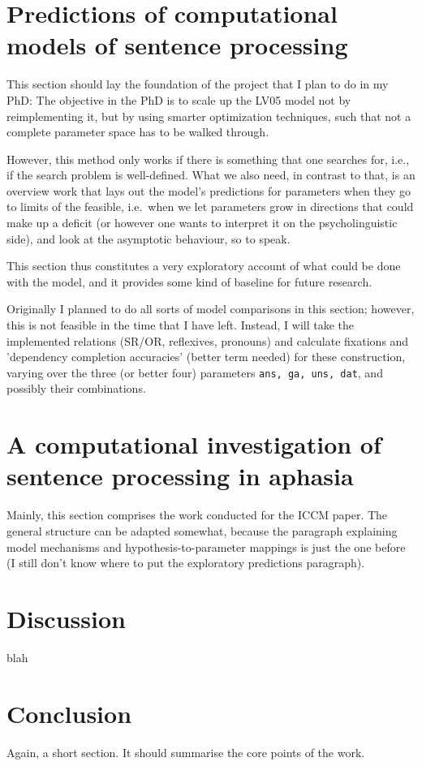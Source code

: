 \documentclass{scrartcl}
\begin{document}
\section{Predictions of computational models of sentence processing}

This section should lay the foundation of the project that I plan to do in my PhD:
The objective in the PhD is to scale up the LV05 model not by reimplementing it, but by
using smarter optimization techniques, such that not a complete parameter space has to 
be walked through.

However, this method only works if there is something that one searches for, i.e., if the
search problem is well-defined. What we also need, in contrast to that, is an overview work
that lays out the model's predictions for parameters when they go to limits of the feasible,
i.e.\ when we let parameters grow in directions that could make up a deficit (or however one
wants to interpret it on the psycholinguistic side), and look at the asymptotic behaviour,
so to speak.

This section thus constitutes a very exploratory account of what could be done with the model,
and it provides some kind of baseline for future research.

Originally I planned to do all sorts of model comparisons in this section; however, this is not feasible
in the time that I have left. Instead, I will take the implemented relations (SR/OR, reflexives, pronouns)
and calculate fixations and 'dependency completion accuracies' (better term needed) for these construction,
varying over the three (or better four) parameters \texttt{ans, ga, uns, dat}, and possibly their combinations.


\section{A computational investigation of sentence processing in aphasia}

Mainly, this section comprises the work conducted for the ICCM paper. The general structure can be adapted
somewhat, because the paragraph explaining model mechanisms and hypothesis-to-parameter mappings is just the 
one before (I still don't know where to put the exploratory predictions paragraph).

\section{Discussion}

blah

\section{Conclusion}

Again, a short section. It should summarise the core points of the work.

%
%
\end{document}
